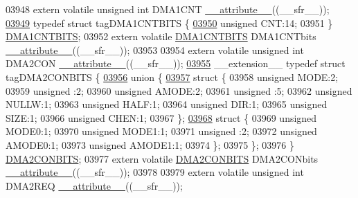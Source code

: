 \begin{DoxyCode}
03948 \textcolor{keyword}{extern} \textcolor{keyword}{volatile} \textcolor{keywordtype}{unsigned} \textcolor{keywordtype}{int}  DMA1CNT \hyperlink{a00009_a493c46f03454991ccc5aa7a6e1dfb2a7}{\_\_attribute\_\_}((\_\_sfr\_\_));
\hypertarget{a00009_source_l03949}{}\hyperlink{a00008}{03949} \textcolor{keyword}{typedef} \textcolor{keyword}{struct }tagDMA1CNTBITS \{
\hypertarget{a00009_source_l03950}{}\hyperlink{a00008_a30be39d82c244f19fd98dd74227487f6}{03950}   \textcolor{keywordtype}{unsigned} CNT:14;
03951 \} \hyperlink{a00008_d1/d53/a00399}{DMA1CNTBITS};
03952 \textcolor{keyword}{extern} \textcolor{keyword}{volatile} \hyperlink{a00008_d1/d53/a00399}{DMA1CNTBITS} DMA1CNTbits \hyperlink{a00009_a493c46f03454991ccc5aa7a6e1dfb2a7}{\_\_attribute\_\_}((\_\_sfr\_\_));
03953 
03954 \textcolor{keyword}{extern} \textcolor{keyword}{volatile} \textcolor{keywordtype}{unsigned} \textcolor{keywordtype}{int}  DMA2CON \hyperlink{a00009_a493c46f03454991ccc5aa7a6e1dfb2a7}{\_\_attribute\_\_}((\_\_sfr\_\_));
\hypertarget{a00009_source_l03955}{}\hyperlink{a00008}{03955} \_\_extension\_\_ \textcolor{keyword}{typedef} \textcolor{keyword}{struct }tagDMA2CONBITS \{
\hypertarget{a00009_source_l03956}{}\hyperlink{a00009}{03956}   \textcolor{keyword}{union }\{
\hypertarget{a00009_source_l03957}{}\hyperlink{a00009}{03957}     \textcolor{keyword}{struct }\{
03958       \textcolor{keywordtype}{unsigned} MODE:2;
03959       \textcolor{keywordtype}{unsigned} :2;
03960       \textcolor{keywordtype}{unsigned} AMODE:2;
03961       \textcolor{keywordtype}{unsigned} :5;
03962       \textcolor{keywordtype}{unsigned} NULLW:1;
03963       \textcolor{keywordtype}{unsigned} HALF:1;
03964       \textcolor{keywordtype}{unsigned} DIR:1;
03965       \textcolor{keywordtype}{unsigned} SIZE:1;
03966       \textcolor{keywordtype}{unsigned} CHEN:1;
03967     \};
\hypertarget{a00009_source_l03968}{}\hyperlink{a00009}{03968}     \textcolor{keyword}{struct }\{
03969       \textcolor{keywordtype}{unsigned} MODE0:1;
03970       \textcolor{keywordtype}{unsigned} MODE1:1;
03971       \textcolor{keywordtype}{unsigned} :2;
03972       \textcolor{keywordtype}{unsigned} AMODE0:1;
03973       \textcolor{keywordtype}{unsigned} AMODE1:1;
03974     \};
03975   \};
03976 \} \hyperlink{a00008_de/d3d/a00409}{DMA2CONBITS};
03977 \textcolor{keyword}{extern} \textcolor{keyword}{volatile} \hyperlink{a00008_de/d3d/a00409}{DMA2CONBITS} DMA2CONbits \hyperlink{a00009_a493c46f03454991ccc5aa7a6e1dfb2a7}{\_\_attribute\_\_}((\_\_sfr\_\_));
03978 
03979 \textcolor{keyword}{extern} \textcolor{keyword}{volatile} \textcolor{keywordtype}{unsigned} \textcolor{keywordtype}{int}  DMA2REQ \hyperlink{a00009_a493c46f03454991ccc5aa7a6e1dfb2a7}{\_\_attribute\_\_}((\_\_sfr\_\_));

\end{DoxyCode}
